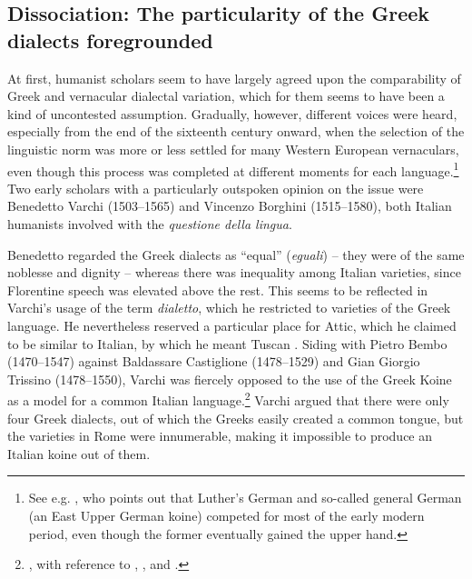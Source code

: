 \subsection{Dissociation: The particularity of the Greek dialects foregrounded}\label{sec:8.1.3}

At first, humanist scholars seem to have largely agreed upon the comparability of Greek and vernacular dialectal variation, which for them seems to have been a kind of uncontested assumption. Gradually, however, different voices were heard, especially from the end of the sixteenth century onward, when the selection of the linguistic norm was more or less settled for many Western European vernaculars, even though this process was completed at different moments for each language.\footnote{See e.g. \citet[217--222]{Mattheier2003}, who points out that Luther’s German and so-called general German (an East Upper German koine) competed for most of the early modern period, even though the former eventually gained the upper hand.} Two early scholars with a particularly outspoken opinion on the issue were Benedetto Varchi (1503–1565) and Vincenzo Borghini (1515–1580), both Italian humanists involved with the \textit{questione della lingua}.

Benedetto \citet[95]{Varchi1570} regarded the Greek dialects as “equal” (\textit{eguali}) – they were of the same noblesse and dignity – whereas there was inequality among Italian varieties, since Florentine speech was elevated above the rest. This seems to be reflected in Varchi’s usage of the term \textit{dialetto}, which he restricted to varieties of the Greek language. He nevertheless reserved a particular place for Attic, which he claimed to be similar to Italian, by which he meant Tuscan \citep[141]{Varchi1570}. Siding with Pietro Bembo (1470–1547) against Baldassare Castiglione (1478–1529) and Gian Giorgio Trissino (1478–1550), Varchi was fiercely opposed to the use of the Greek Koine as a model for a common Italian language.\footnote{\citet[269--271]{Varchi1570}, with reference to \citet{Bembo1525}, \citet{Castiglione1528}, and \citet{Trissino1529}.} Varchi argued that there were only four Greek dialects, out of which the Greeks easily created a common tongue, but the varieties in Rome were innumerable, making it impossible to produce an Italian koine out of them.

